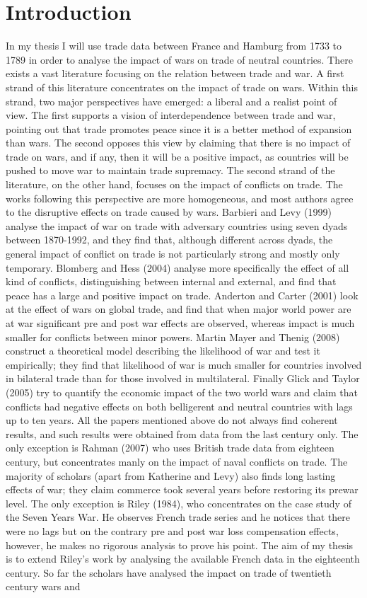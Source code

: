\documentclass[12pt,a4paper,titlepage]{article}
\begin{document}
\section{Introduction}
In my thesis I will use trade data between France and Hamburg from 1733 to 1789 in order to analyse the impact of wars on trade of neutral countries. There exists a vast literature focusing on the relation between trade and war. A first strand of this literature concentrates on the impact of trade on wars. Within this strand, two major perspectives have emerged: a liberal and a realist point of view. The first supports a vision of interdependence between trade and war, pointing out that trade promotes peace since it is a better method of expansion than wars. The second opposes this view by claiming that there is no impact of trade on wars, and if any, then it will be a positive impact, as countries will be pushed to move war to maintain trade supremacy. The second strand of the literature, on the other hand, focuses on the impact of conflicts on trade. The works following this perspective are more homogeneous, and most authors agree to the disruptive effects on trade caused by wars. Barbieri and Levy (1999) analyse the impact of war on trade with adversary countries using seven dyads between 1870-1992, and they find that, although different across dyads, the general impact of conflict on trade is not particularly strong and mostly only temporary. Blomberg and Hess (2004) analyse more specifically the effect of all kind of conflicts, distinguishing between internal and external, and find that peace has a large and positive impact on trade. Anderton and Carter (2001) look at the effect of wars on global trade, and find that when major world power are at war significant pre and post war effects are observed, whereas impact is much smaller for conflicts between minor powers. Martin Mayer and Thenig (2008) construct a theoretical model describing the likelihood of war and test it empirically; they find that likelihood of war is much smaller for countries involved in bilateral trade than for those involved in multilateral. Finally Glick and Taylor (2005) try to quantify the economic impact of the two world wars and claim that conflicts had negative effects on both belligerent and neutral countries with lags up to ten years. All the papers mentioned above do not always find coherent results, and such results were obtained from data from the last century only. The only exception is Rahman (2007) who uses British trade data from eighteen century, but concentrates manly on the impact of naval conflicts on trade. The majority of scholars (apart from Katherine and Levy) also finds long lasting effects of war; they claim commerce took several years before restoring its prewar level. The only exception is Riley (1984), who concentrates on the case study of the Seven Years War. He observes French trade series and he notices that there were no lags but on the contrary pre and post war loss compensation effects, however, he makes no rigorous analysis to prove his point. The aim of my thesis is to extend Riley’s work by analysing the available French data in the eighteenth century. So far the scholars have analysed the impact on trade of twentieth century wars and 
\end{document}
